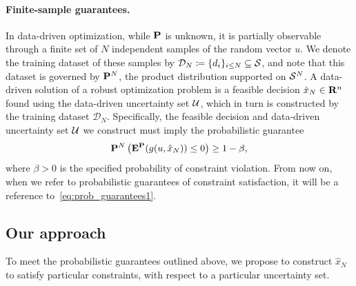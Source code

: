\documentclass[12pt]{article}
\theoremstyle{thmstyleone}%
\theoremstyle{thmstyletwo}%
\theoremstyle{thmstylethree}%
\begin{document}
\paragraph{Finite-sample guarantees.}%
\label{par:finite_sample_guarantees}
In data-driven optimization, while ${\mathbf P}$ is unknown, it is partially observable through a finite set of $N$ independent samples of the random vector $u$.
We denote the training dataset of these samples by ${\mathcal{D}}_N \coloneqq \{d_i\}_{i\leq N} \subseteq \mathcal{S}$, and note that this dataset is governed by ${\mathbf P}^N$, the product distribution supported on $\mathcal{S}^{N}$.
A data-driven solution of a robust optimization problem is a feasible decision $\hat{x}_N \in {\mathbf R}^n$ found using the data-driven uncertainty set ${\mathcal{U}}$, which in turn is constructed by the training dataset ${\mathcal{D}}_N $.
Specifically, the feasible decision and data-driven uncertainty set ${\mathcal{U}}$ we construct must imply the probabilistic guarantee
\begin{equation}
	\label{eq:prob_guarantees1}
	{\mathbf P}^N\left( \mathbf{E}^{{\mathbf P}}(g(u, \hat{x}_N)) \le 0\right) \ge 1 - \beta,
\end{equation}
where $\beta > 0$ is the specified probability of constraint violation. From now on, when we refer to probabilistic guarantees of constraint satisfaction, it will be a reference to~\eqref{eq:prob_guarantees1}.


\subsection{Our approach}
To meet the probabilistic guarantees outlined above, we propose to construct $\hat{x}_N$ to satisfy particular constraints, with respect to a particular uncertainty set. 
\end{document}
